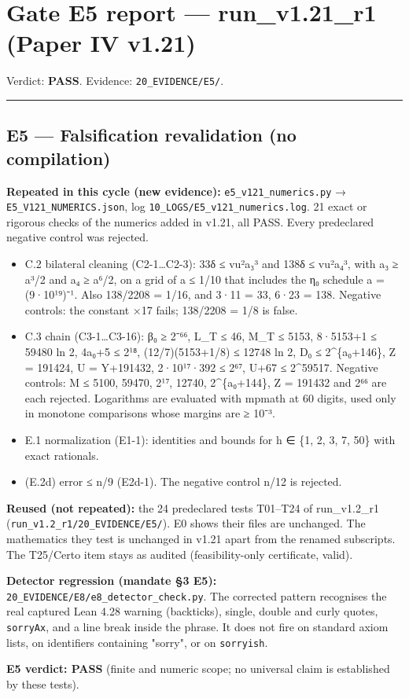 \documentclass[
]{article}
\author{}
\date{}
\providecommand{\tightlist}{%
  \setlength{\itemsep}{0pt}\setlength{\parskip}{0pt}}
\begin{document}
\section{Gate E5 report --- run\_v1.21\_r1 (Paper IV
v1.21)}\label{gate-e5-report--run_v121_r1-paper-iv-v121}

Verdict: \textbf{PASS}. Evidence: \texttt{20\_EVIDENCE/E5/}.

\begin{center}\rule{0.5\linewidth}{0.5pt}\end{center}

\subsection{E5 --- Falsification revalidation (no
compilation)}\label{e5--falsification-revalidation-no-compilation}

\textbf{Repeated in this cycle (new evidence):}
\texttt{e5\_v121\_numerics.py} → \texttt{E5\_V121\_NUMERICS.json}, log
\texttt{10\_LOGS/E5\_v121\_numerics.log}. 21 exact or rigorous checks of
the numerics added in v1.21, all PASS. Every predeclared negative
control was rejected.

\begin{itemize}
\tightlist
\item
  C.2 bilateral cleaning (C2-1\ldots C2-3): 33δ ≤ vu²a₃³ and 138δ ≤
  vu²a₄³, with a₃ ≥ a³/2 and a₄ ≥ a⁶/2, on a grid of a ≤ 1/10 that
  includes the η₀ schedule a = (9·10¹⁹)⁻¹. Also 138/2208 = 1/16, and
  3·11 = 33, 6·23 = 138. Negative controls: the constant ×17 fails;
  138/2208 = 1/8 is false.
\item
  C.3 chain (C3-1\ldots C3-16): β₀ ≥ 2⁻⁶⁶, L\_T ≤ 46, M\_T ≤ 5153,
  8·5153+1 ≤ 59480 ln 2, 4a₀+5 ≤ 2¹⁸, (12/7)(5153+1/8) ≤ 12748 ln 2, D₀
  ≤ 2\^{}\{a₀+146\}, Z = 191424, U = Y+191432, 2·10¹⁷·392 ≤ 2⁶⁷, U+67 ≤
  2\^{}59517. Negative controls: M ≤ 5100, 59470, 2¹⁷, 12740,
  2\^{}\{a₀+144\}, Z = 191432 and 2⁶⁶ are each rejected. Logarithms are
  evaluated with mpmath at 60 digits, used only in monotone comparisons
  whose margins are ≥ 10⁻³.
\item
  E.1 normalization (E1-1): identities and bounds for h ∈ \{1, 2, 3, 7,
  50\} with exact rationals.
\item
  (E.2d) error ≤ n/9 (E2d-1). The negative control n/12 is rejected.
\end{itemize}

\textbf{Reused (not repeated):} the 24 predeclared tests T01--T24 of
run\_v1.2\_r1 (\texttt{run\_v1.2\_r1/20\_EVIDENCE/E5/}). E0 shows their
files are unchanged. The mathematics they test is unchanged in v1.21
apart from the renamed subscripts. The T25/Certo item stays as audited
(feasibility-only certificate, valid).

\textbf{Detector regression (mandate §3 E5):}
\texttt{20\_EVIDENCE/E8/e8\_detector\_check.py}. The corrected pattern
recognises the real captured Lean 4.28 warning (backticks), single,
double and curly quotes, \texttt{sorryAx}, and a line break inside the
phrase. It does not fire on standard axiom lists, on identifiers
containing "sorry", or on \texttt{sorryish}.

\textbf{E5 verdict: PASS} (finite and numeric scope; no universal claim
is established by these tests).
\end{document}
